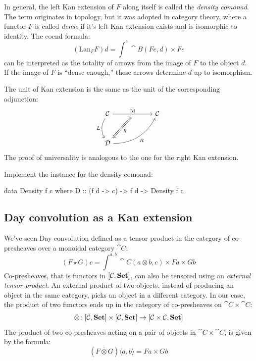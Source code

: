 \documentclass[DaoFP]{subfiles}
\begin{document}
In general, the left Kan extension of $F$ along itself is called the  \emph{density comonad}. The term originates in topology, but it was adopted in category theory, where a functor $F$ is called \emph{dense} if it's left Kan extension exists and is isomorphic to identity. The coend formula:
\[ (\text{Lan}_F F) d = \int^e \cat B (F e, d) \times F e \]
can be interpreted as the totality of arrows from the image of $F$ to the object $d$. If the image of $F$ is ``dense enough,'' these arrows determine $d$ up to isomorphism. 


The unit of Kan extension is the same as the unit of the corresponding adjunction:
\[
 \begin{tikzcd} [row sep=1cm, column sep=1cm]
 \cat C
 \arrow[rr, "\text{Id}", "" {name=ID, below} ]
 \arrow[d, bend right, "L"']
 && \cat C
 \\
 \cat D
  \arrow[urr, bend right, "R"']
 \arrow[Rightarrow, "\eta",  from=ID]
 \end{tikzcd}
\]
The proof of universality is analogous to the one for the right Kan extension.

\begin{exercise}
Implement the  instance for the density comonad:
\begin{haskell}
data Density f c where
   D :: (f d -> c) -> f d -> Density f c
\end{haskell}
\end{exercise}

\subsection{Day convolution as a Kan extension}

We've seen Day convolution defined as a tensor product in the category of co-presheaves over a monoidal category $\cat C$:
\[ (F \star G) c = \int^{a, b} \cat C (a \otimes b, c) \times F a \times G b \]
Co-presheaves, that is functors in $[\mathcal{C}, \mathbf{Set}]$, can also be tensored using an \emph{external tensor product}. An external product of two objects, instead of producing an object in the same category, picks an object in a different category. In our case, the product of two functors ends up in the category of co-presheaves on $\cat C \times \cat C$:
\[ \bar{\otimes} \colon [\mathcal{C}, \mathbf{Set}] \times [\mathcal{C}, \mathbf{Set}] \to [\mathcal{C} \times \mathcal{C}, \mathbf{Set}] \]
The product of two co-presheaves acting on a pair of objects in $\cat C \times \cat C$, is given by the formula:
\[ (F \bar{\otimes} G)\langle a, b \rangle = F a \times G b \]
\end{document}
